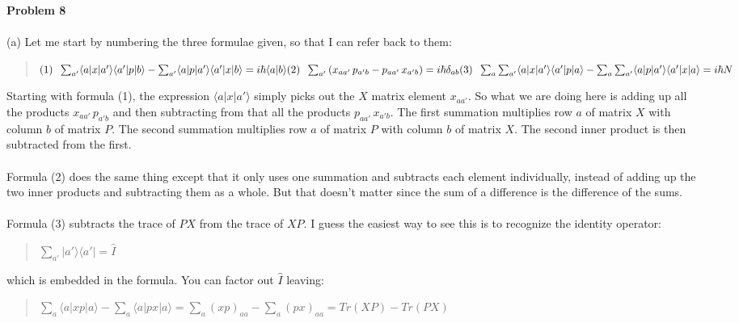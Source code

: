 \documentclass{article}
\begin{document}
\pagebreak
{\bf Problem 8} 
\\\\
(a) Let me start by numbering the three formulae given, so that I can
refer back to them:
\begin{quote}
$
    \vspace{-6pt}\\
    (1)\;\;\sum_{a'}
        \langle a|x|a'\rangle
        \langle a'|p|b\rangle
    - \sum_{a'}
        \langle a|p|a'\rangle
        \langle a'|x|b\rangle
    = i\hbar\langle a|b\rangle
\vspace{12pt}\\
    (2)\;\;\sum_{a'}\left(
        x_{aa'}\, p_{a'b} - p_{aa'}\, x_{a'b}
        \right) = i\hbar\delta_{ab}
\vspace{12pt}\\
    (3)\;\;\sum_{a}\sum_{a'}
        \langle a|x|a'\rangle
        \langle a'|p|a\rangle
    - \sum_{a}\sum_{a'}
        \langle a|p|a'\rangle
        \langle a'|x|a\rangle
    = i\hbar N
$
\end{quote}
Starting with formula (1), the expression $\langle a|x|a'\rangle$
simply picks out the $X$ matrix element $x_{aa'}$. So what we are doing
here is adding up all the products $x_{aa'}\,p_{a'b}$ and then subtracting
from that all the products $p_{aa'}\,x_{a'b}$. The first summation
multiplies row $a$ of matrix $X$ with column $b$ of matrix $P$. The
second summation multiplies row $a$ of matrix $P$ with column $b$ of matrix
$X$. The second inner product is then subtracted from the first.
\\\\
Formula (2) does the same thing except that it only uses one summation
and subtracts each element individually, instead of adding up the two
inner products and subtracting them as a whole. But that doesn't matter
since the sum of a difference is the difference of the sums.
\\\\
Formula (3) subtracts the trace of $PX$ from the trace of $XP$. I guess
the easiest way to see this is to recognize
the identity operator: 
\begin{quote}
$
    \sum_{a'}|a'\rangle \langle a'| = \hat{I}
$
\end{quote}
which is embedded in the formula. You can factor out $\hat{I}$ leaving:
\begin{quote}
$
    \sum_{a} 
    \langle a|x p|a\rangle
    - \sum_{a} \langle a|p x|a\rangle
    = \sum_{a} (xp)_{aa} - \sum_{a} (px)_{aa}
    = Tr(XP) - Tr(PX)
$
\end{quote}
\end{document}
